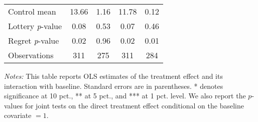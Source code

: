 \begin{table}[htbp]
{\begin{threeparttable}
\begin{tabular}{l*{4}{c}}
Control mean    &    13.66         &     1.16         &    11.78         &     0.12         \\
Lottery \emph{p}-value&     0.08         &     0.53         &     0.07         &     0.46         \\
Regret \emph{p}-value&     0.02         &     0.96         &     0.02         &     0.01         \\
Observations    &      311         &      275         &      311         &      284         \\
\bottomrule \end{tabular} \begin{tablenotes}[flushleft] \footnotesize \item \emph{Notes:} This table reports OLS estimates of the treatment effect and its interaction with baseline. Standard errors are in parentheses. * denotes significance at 10 pct., ** at 5 pct., and *** at 1 pct. level. We also report the \(p\)-values for joint tests on the direct treatment effect conditional on the baseline covariate $= 1$. \end{tablenotes} \end{threeparttable} } \end{table}

